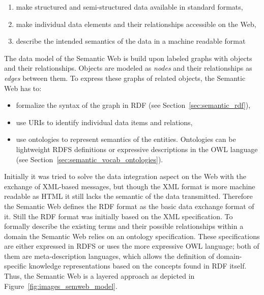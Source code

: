 \begin{enumerate}
	\item make structured and semi-structured data available in standard formats,
	\item make individual data elements and their relationships accessible on the Web,
	\item describe the intended semantics of the data in a machine readable format
\end{enumerate}

The data model of the Semantic Web is build upon labeled graphs with objects and their relationships. Objects are modeled as \emph{nodes} and their relationships as \emph{edges} between them. To express these graphs of related objects, the Semantic Web has to: \@

\begin{itemize}
	\item formalize the syntax of the graph in \gls{RDF} (see Section~\ref{sec:semantic_rdf}),
	\item use \gls{URI}s to identify individual data items and relations,
	\item use ontologies to represent semantics of the entities. Ontologies can be lightweight \gls{RDFS} definitions or expressive descriptions in the \gls{OWL} language (see Section~\ref{sec:semantic_vocab_ontologies}).
\end{itemize}

Initially it was tried to solve the data integration aspect on the Web with the exchange of \gls{XML}-based messages, but though the \gls{XML} format is more machine readable as \gls{HTML} it still lacks the semantic of the data transmitted. Therefore the Semantic Web defines the \gls{RDF} format as the basic data exchange format of it. Still the \gls{RDF} format was initially based on the \gls{XML} specification. To formally describe the existing terms and their possible relationships within a domain the Semantic Web relies on an ontology specification. These specifications are either expressed in \gls{RDFS} or uses the more expressive \gls{OWL} language; both of them are meta-description languages, which allows the definition of domain-specific knowledge representations based on the concepts found in \gls{RDF} itself. \\

Thus, the Semantic Web is a layered approach as depicted in Figure~\ref{fig:images_semweb_model}.\@

